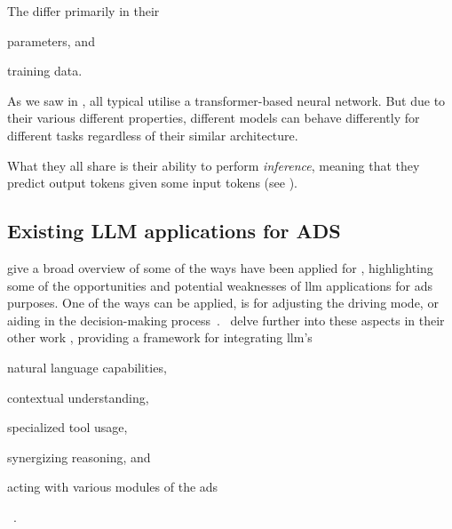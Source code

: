 The  differ primarily in their \begin{inparaenum}
    \item parameters, and
    \item training data.
\end{inparaenum}
As we saw in , all typical  utilise a transformer-based neural
network. But due to their various different properties, different models can behave differently for
different tasks regardless of their similar architecture.

What they all share is their ability to perform \textit{inference}, meaning that they predict output
tokens given some input tokens (see ).

\subsection{Existing LLM applications for ADS}\label{sec:llmsForAds}


\citeauthor{LLM4AD} give a broad overview of some of the ways  have been applied for
, highlighting some of the opportunities and potential weaknesses of \acrshort{llm}
applications for \acrshort{ads} purposes. One of the ways  can be applied, is for
adjusting the driving mode, or aiding in the decision-making
process~\cite[1]{LLM4AD}.~\citeauthor{driveAsYouSpeak} delve further into these aspects in their
other work , providing a framework for integrating \acrlong{llm}'s
\begin{inparaenum}
    \item natural language capabilities,
    \item contextual understanding,
    \item specialized tool usage,
    \item synergizing reasoning, and
    \item acting with various modules of the \acrshort{ads}
\end{inparaenum}~\cite[1]{driveAsYouSpeak}.